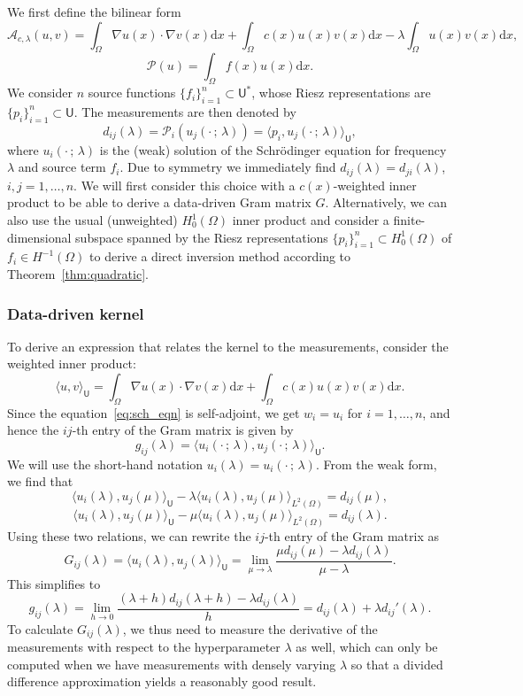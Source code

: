 \documentclass[12pt]{amsart}
\newcommand{\U}{\mathsf{U}}
\newcommand{\yy}[1]{\textcolor{blue}{{YY: #1}}}
\begin{document}
We first define the bilinear form
$$\mathcal{A}_{c,\lambda}(u,v)=\int_{\Omega} \nabla u(x)\cdot \nabla v(x)\mathrm{d}x + \int_{\Omega} c(x)u(x)v(x)\mathrm{d}x - \lambda \int_{\Omega} u(x)v(x)\mathrm{d}x,$$
$$\mathcal{P}(u) = \int_{\Omega} f(x)u(x)\mathrm{d}x.$$
We consider $n$ source functions $\{f_i\}_{i=1}^n \subset \U^*$, whose Riesz representations are $\{p_i\}_{i=1}^n \subset \mathsf{U}$. 
The measurements are then denoted by
\[
d_{ij}(\lambda) = \mathcal{P}_i(u_j(\cdot\,;\,\lambda)) = \langle p_i, u_j(\cdot \,;\,\lambda)\rangle_\mathsf{U},
\]
where $u_i(\cdot\,;\,\lambda)$ is the (weak) solution of the Schr{\"o}dinger equation for frequency $\lambda$ and source term $f_i$. Due to symmetry we immediately find $d_{ij}(\lambda)=d_{ji}(\lambda)$, $i,j=1,\ldots,n$.  
We will first consider this choice with a $c(x)$-weighted inner product to be able to derive a data-driven Gram matrix $G$. Alternatively, we can also use the usual (unweighted) $H^1_0(\Omega)$ inner product and consider a finite-dimensional subspace spanned by the Riesz representations $\{p_i\}_{i=1}^n \subset H_0^1(\Omega)$ of $f_i \in H^{-1}(\Omega)$ to derive a direct inversion method according to Theorem~\ref{thm:quadratic}.

\subsubsection{Data-driven kernel}
To derive an expression that relates the kernel to the measurements, consider the weighted inner product:
$$\langle u,v\rangle_{\mathsf{U}} = \int_{\Omega} \nabla u(x)\cdot\nabla v(x)\mathrm{d}x + \int_{\Omega} c(x)u(x)v(x)\mathrm{d}x.$$
Since the equation~\eqref{eq:sch_eqn} is self-adjoint, we get $w_i = u_i$ for $i=1,\ldots,n$, and hence the $ij$-th entry of the Gram matrix is given by
$$g_{ij}(\lambda) = \langle u_i(\cdot \, ;\, \lambda), u_j(\cdot\,;\,\lambda)\rangle_\mathsf{U}.$$
We will use the short-hand notation $u_i(\lambda) = u_i(\cdot \, ;\, \lambda)$. From the weak form, we find that 
$$\langle u_i(\lambda), u_j(\mu)\rangle_{\mathsf{U}} - \lambda\langle u_i(\lambda),u_j(\mu)\rangle_{L^2(\Omega)} = d_{ij}(\mu),$$
$$\langle u_i(\lambda), u_j(\mu)\rangle_{\mathsf{U}} - \mu\langle u_i(\lambda),u_j(\mu)\rangle_{L^2(\Omega)} = d_{ij}(\lambda).$$
Using these two relations, we can rewrite the $ij$-th entry of the Gram matrix as
$$G_{ij}(\lambda)=\langle u_i(\lambda), u_j(\lambda)\rangle_{\mathsf{U}} = \lim_{\mu\rightarrow\lambda}\frac{\mu d_{ij}(\mu) - \lambda d_{ij}(\lambda)}{\mu-\lambda}.$$
This simplifies to
$$
g_{ij}(\lambda) = \lim_{h\rightarrow 0}\frac{(\lambda + h)d_{ij}(\lambda+h) - \lambda d_{ij}(\lambda)}{h} = d_{ij}(\lambda)+\lambda d_{ij}'(\lambda).
$$
To calculate $G_{ij}(\lambda)$,  we thus need to measure the derivative of the measurements with respect to the hyperparameter $\lambda$ as well, which can only be computed when we have measurements with densely varying $\lambda$ so that a divided difference approximation yields a reasonably good result. %
\end{document}
